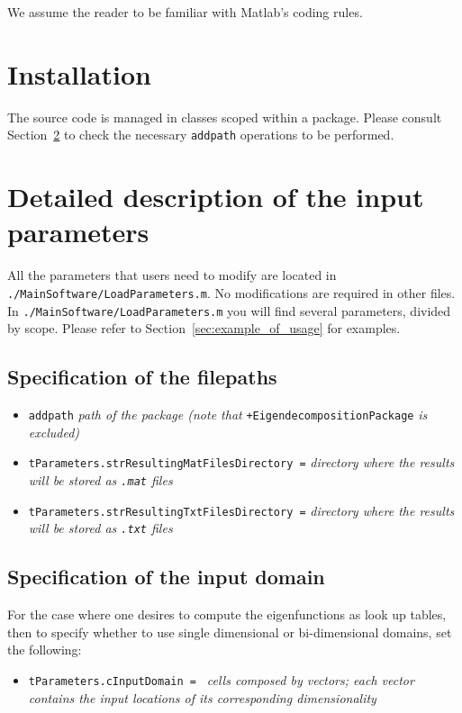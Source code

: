 \documentclass[a4paper, 10pt, twoside]{article} %
\begin{document}
We assume the reader to be familiar with Matlab\textregistered's coding rules.

\section{Installation}
\label{sec:installation}

The source code is managed in classes scoped within a package. Please consult Section~\ref{sec:input_parameters} to check the necessary \texttt{addpath} operations to be performed.


\section{Detailed description of the input parameters}
\label{sec:input_parameters}

All the parameters that users need to modify are located in \texttt{./MainSoftware/LoadParameters.m}. No modifications are required in other files. In \texttt{./MainSoftware/LoadParameters.m} you will find several parameters, divided by scope. Please refer to Section~\ref{sec:example_of_usage} for examples.


\subsection{Specification of the filepaths}
\label{ssec:filepaths}

\begin{itemize}
	\item \texttt{addpath} \emph{path of the package (note that} \texttt{+EigendecompositionPackage} \emph{is excluded)}
	\item \texttt{tParameters.strResultingMatFilesDirectory =} \emph{directory where the results will be stored as \texttt{.mat} files}
	\item \texttt{tParameters.strResultingTxtFilesDirectory =} \emph{directory where the results will be stored as \texttt{.txt} files}
\end{itemize}


\subsection{Specification of the input domain}
\label{ssec:input_domain}

For the case where one desires to compute the eigenfunctions as look up tables, then to specify whether to use single dimensional or bi-dimensional domains, set the following: 
%
\begin{itemize}
	\item \texttt{tParameters.cInputDomain = } \emph{cells composed by vectors; each vector contains the input locations of its corresponding dimensionality}
\end{itemize}
\end{document}
